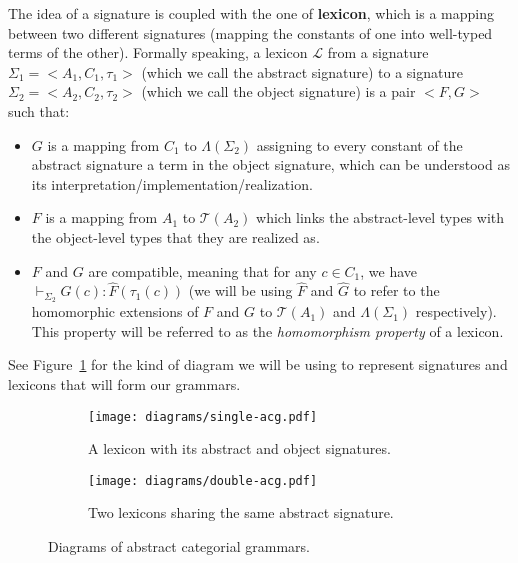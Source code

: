 The idea of a signature is coupled with the one of \textbf{lexicon},
which is a mapping between two different signatures (mapping the
constants of one into well-typed terms of the other). Formally speaking,
a lexicon $\mathcal{L}$ from a signature $\Sigma_1 = \mathopen{<}A_1,
C_1, \tau_1\mathclose{>}$ (which we call the abstract signature) to a
signature $\Sigma_2 = \mathopen{<}A_2, C_2, \tau_2\mathclose{>}$ (which
we call the object signature) is a pair $\mathopen{<}F, G\mathclose{>}$
such that:

\begin{itemize}
\item $G$ is a mapping from $C_1$ to $\Lambda(\Sigma_2)$ assigning to
  every constant of the abstract signature a term in the object
  signature, which can be understood as its
  interpretation/implementation/realization.
\item $F$ is a mapping from $A_1$ to $\mathcal{T}(A_2)$ which links the
  abstract-level types with the object-level types that they are
  realized as.
\item $F$ and $G$ are compatible, meaning that for any $c \in C_1$, we
  have $\vdash_{\Sigma_2} G(c) : \hat{F}(\tau_1(c))$ (we will be using
  $\hat{F}$ and $\hat{G}$ to refer to the homomorphic extensions of $F$
  and $G$ to $\mathcal{T}(A_1)$ and $\Lambda(\Sigma_1)$
  respectively). This property will be referred to as the
  \emph{homomorphism property} of a lexicon.
\end{itemize}

See Figure~\ref{fig:single-acg} for the kind of diagram we will be using
to represent signatures and lexicons that will form our grammars.

\begin{figure}
  \centering
  \begin{subfigure}[b]{0.4\textwidth}
    \centering
    \texttt{[image: diagrams/single-acg.pdf]}
    \caption{{\label{fig:single-acg} A lexicon with its abstract
        and object signatures.}}
  \end{subfigure}
  \qquad
  \begin{subfigure}[b]{0.4\textwidth}
    \centering
    \texttt{[image: diagrams/double-acg.pdf]}
    \caption{{\label{fig:double-acg} Two lexicons sharing the same
        abstract signature.}}
  \end{subfigure}
  \caption{Diagrams of abstract categorial grammars.}
\end{figure}

